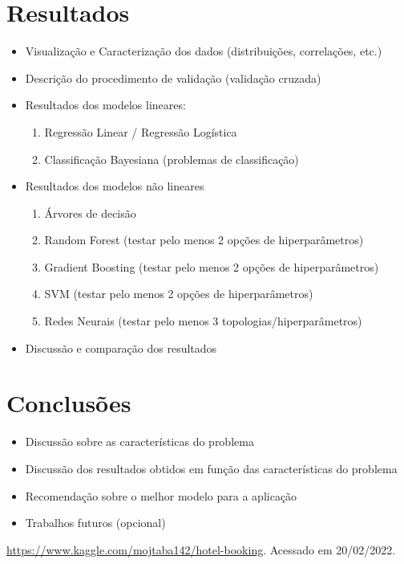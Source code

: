\documentclass{homework}
\begin{document}
\section{Resultados}

\begin{itemize}
    \color{red}
        \item Visualização e Caracterização dos dados (distribuições, correlações, etc.)
        \item Descrição do procedimento de validação (validação cruzada)
        \item Resultados dos modelos lineares:
            \begin{enumerate}
                \item Regressão Linear / Regressão Logística
                \item Classificação Bayesiana (problemas de classificação)
            \end{enumerate}
        \item Resultados dos modelos não lineares
            \begin{enumerate}
                \item Árvores de decisão
                \item Random Forest (testar pelo menos 2 opções de hiperparâmetros)
                \item Gradient Boosting (testar pelo menos 2 opções de hiperparâmetros)
                \item SVM (testar pelo menos 2 opções de hiperparâmetros)
                \item Redes Neurais (testar pelo menos 3 topologias/hiperparâmetros)
            \end{enumerate}
        \item Discussão e comparação dos resultados
\end{itemize}

\section{Conclusões}

\begin{itemize}
    \color{red}
        \item Discussão sobre as características do problema
        \item Discussão dos resultados obtidos em função das características do problema
        \item Recomendação sobre o melhor modelo para a aplicação
        \item Trabalhos futuros (opcional)
\end{itemize}

\begin{thebibliography}{1}
     \url{https://www.kaggle.com/mojtaba142/hotel-booking}. Acessado em 20/02/2022.
\end{thebibliography}
\end{document}
